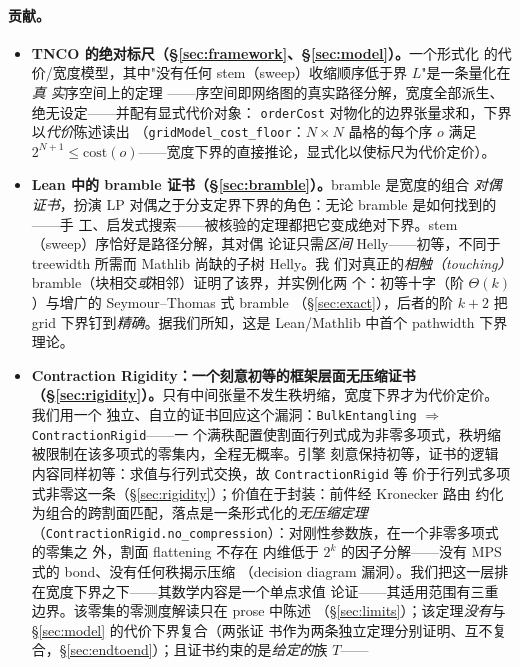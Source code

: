 \documentclass[11pt]{ctexart}
\begin{document}
\paragraph{贡献。}
\begin{itemize}
  \item \textbf{TNCO 的绝对标尺（\S\ref{sec:framework}、\S\ref{sec:model}）。}一个形式化
    的代价/宽度模型，其中"没有任何 stem（sweep）收缩顺序低于界 $L$"是一条量化在\emph{真
    实}序空间上的定理
    ——序空间即网络图的真实路径分解，宽度全部派生、绝无设定——并配有显式代价对象：
    \texttt{orderCost} 对物化的边界张量求和，下界以\emph{代价}陈述读出
    （\texttt{gridModel\_cost\_floor}：$N\times N$ 晶格的每个序 $o$ 满足
    $2^{N+1}\le\mathrm{cost}(o)$——宽度下界的直接推论，显式化以使标尺为代价定价）。
  \item \textbf{Lean 中的 bramble 证书（\S\ref{sec:bramble}）。}bramble 是宽度的组合
    \emph{对偶证书}，扮演 LP 对偶之于分支定界下界的角色：无论 bramble 是如何找到的——手
    工、启发式搜索——被核验的定理都把它变成绝对下界。stem（sweep）序恰好是路径分解，其对偶
    论证只需\emph{区间} Helly——初等，不同于 treewidth 所需而 Mathlib 尚缺的子树 Helly。我
    们对真正的\emph{相触（touching）}bramble（块相交\emph{或}相邻）证明了该界，并实例化两
    个：初等十字（阶 $\Theta(k)$）与增广的 Seymour--Thomas 式 bramble
    （\S\ref{sec:exact}），后者的阶 $k+2$ 把 grid 下界钉到\emph{精确}。据我们所知，这是
    Lean/Mathlib 中首个 pathwidth 下界理论。
  \item \textbf{Contraction Rigidity：一个刻意初等的框架层面无压缩证书
    （\S\ref{sec:rigidity}）。}只有中间张量不发生秩坍缩，宽度下界才为代价定价。我们用一个
    独立、自立的证书回应这个漏洞：\texttt{BulkEntangling} $\Rightarrow$
    \texttt{ContractionRigid}——一
    个满秩配置使割面行列式成为非零多项式，秩坍缩被限制在该多项式的零集内，全程无概率。引擎
    刻意保持初等，证书的逻辑内容同样初等：求值与行列式交换，故 \texttt{ContractionRigid} 等
    价于行列式多项式非零这一条（\S\ref{sec:rigidity}）；价值在于封装：前件经 Kronecker 路由
    约化为组合的跨割面匹配，落点是一条形式化的\emph{无压缩定理}
    （\texttt{ContractionRigid.no\_compression}）：对刚性参数族，在一个非零多项式的零集之
    外，割面 flattening 不存在
    内维低于 $2^k$ 的因子分解——没有 MPS 式的 bond、没有任何秩揭示压缩
    （decision diagram 漏洞）。我们把这一层排在宽度下界之下——其数学内容是一个单点求值
    论证——其适用范围有三重边界。该零集的零测度解读只在 prose 中陈述
    （\S\ref{sec:limits}）；该定理\emph{没有}与 \S\ref{sec:model} 的代价下界复合（两张证
    书作为两条独立定理分别证明、互不复合，\S\ref{sec:endtoend}）；且证书约束的是\emph{给定的}族 $T$——

\end{itemize}
\end{document}
